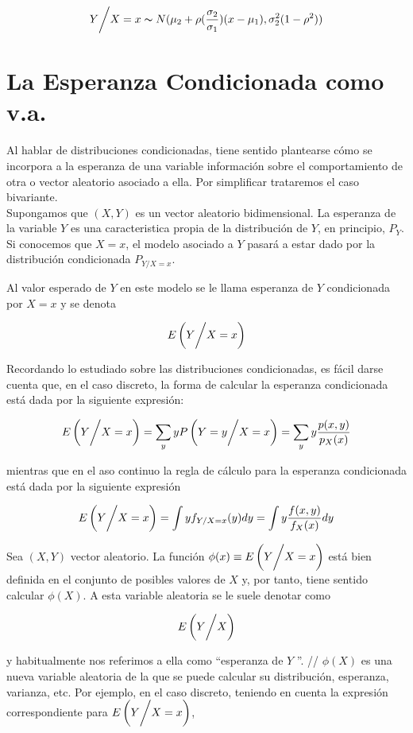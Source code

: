 \documentclass{article}
\begin{document}
\[ Y \bigg{/} X = x \thicksim N(\mu_2 + \rho(\frac{\sigma_2}{\sigma_1})(x-\mu_1), \sigma_2^2(1-\rho^2)) \]


\section{La Esperanza Condicionada como v.a.}


Al hablar de distribuciones condicionadas, tiene sentido plantearse cómo se incorpora a la esperanza de una variable información sobre el comportamiento de otra
o vector aleatorio asociado a ella. Por simplificar trataremos el caso bivariante. \\
Supongamos que $(X,Y)$ es un vector aleatorio bidimensional. La esperanza de la variable $Y$ es una caracteristica propia de la distribución de $Y$, en principio, $P_Y$.
Si conocemos que $X = x$, el modelo asociado a $Y$ pasará a estar dado por la distribución condicionada $P_{Y/X = x}$. 

\newpage

Al valor esperado de $Y$ en este modelo se le llama esperanza de $Y$ condicionada por $X=x$ y se denota

\[ E\left( Y \bigg{/} X = x \right) \]

Recordando lo estudiado sobre las distribuciones condicionadas, es fácil darse cuenta que, en el caso discreto, la forma de calcular la esperanza condicionada
está dada por la siguiente expresión:

\[ E\left( Y \bigg{/} X = x \right) = \sum_yyP\left(Y=y\bigg{/X=x}\right) = \sum_yy\frac{p(x,y)}{p_X(x)} \]

mientras que en el aso continuo la regla de cálculo para la esperanza condicionada está dada por la siguiente expresión

\[ E\left( Y \bigg{/} X = x \right) = \int yf_{Y/X=x}(y)dy = \int y\frac{f(x,y)}{f_X(x)}dy \]

Sea $(X,Y)$ vector aleatorio. La función $\phi(x) \equiv E\left( Y \bigg{/} X = x \right)$ está bien definida en el conjunto de posibles valores de $X$ y, por tanto,
tiene sentido calcular $\phi(X)$. A esta variable aleatoria se le suele denotar como

\[ E\left( Y \bigg{/} X \right) \]

y habitualmente nos referimos a ella como ``esperanza de $Y$ ''. //
$\phi(X)$ es una nueva variable aleatoria de la que se puede calcular su distribución, esperanza, varianza, etc. Por ejemplo, en el caso discreto, teniendo en cuenta
la expresión correspondiente para $E\left( Y \bigg{/} X = x \right)$,
\end{document}
